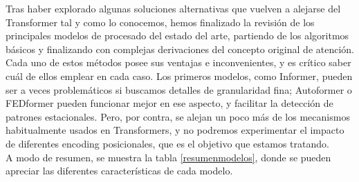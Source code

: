 {Tras haber explorado algunas soluciones alternativas que vuelven a alejarse del Transformer tal y como lo conocemos, hemos finalizado la revisión de los principales modelos de procesado del estado del arte, partiendo de los algoritmos básicos y finalizando con complejas derivaciones del concepto original de atención.\\

Cada uno de estos métodos posee sus ventajas e inconvenientes, y es crítico saber cuál de ellos emplear en cada caso. Los primeros modelos, como Informer, pueden ser a veces problemáticos si buscamos detalles de granularidad fina; Autoformer o FEDformer pueden funcionar mejor en ese aspecto, y facilitar la detección de patrones estacionales. Pero, por contra, se alejan un poco más de los mecanismos habitualmente usados en Transformers, y no podremos experimentar el impacto de diferentes encoding posicionales, que es el objetivo que estamos tratando. \\

A modo de resumen, se muestra la tabla \ref{resumenmodelos}, donde se pueden apreciar las diferentes características de cada modelo.

}
